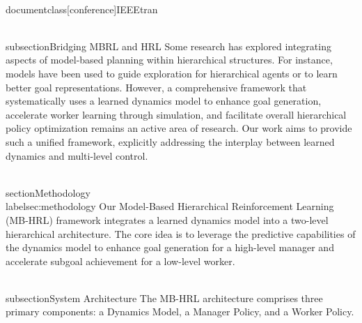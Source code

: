 \\documentclass[conference]{IEEEtran}
\begin{document}
\\subsection{Bridging MBRL and HRL}
Some research has explored integrating aspects of model-based planning within hierarchical structures. For instance, models have been used to guide exploration for hierarchical agents or to learn better goal representations. However, a comprehensive framework that systematically uses a learned dynamics model to enhance goal generation, accelerate worker learning through simulation, and facilitate overall hierarchical policy optimization remains an active area of research. Our work aims to provide such a unified framework, explicitly addressing the interplay between learned dynamics and multi-level control.

\\section{Methodology} \\label{sec:methodology}
Our Model-Based Hierarchical Reinforcement Learning (MB-HRL) framework integrates a learned dynamics model into a two-level hierarchical architecture. The core idea is to leverage the predictive capabilities of the dynamics model to enhance goal generation for a high-level manager and accelerate subgoal achievement for a low-level worker.

\\subsection{System Architecture}
The MB-HRL architecture comprises three primary components: a Dynamics Model, a Manager Policy, and a Worker Policy.
\end{document}
